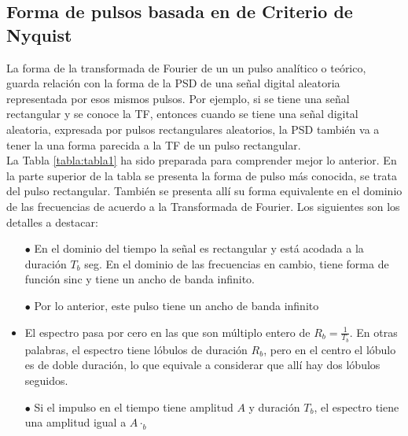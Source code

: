 \subsection{Forma de pulsos basada en de Criterio de Nyquist}

La forma de la transformada de Fourier de un un pulso analítico o teórico, guarda relación con la forma de la PSD de una señal digital aleatoria representada por esos mismos pulsos. Por ejemplo, si se tiene una señal rectangular y se conoce la TF, entonces cuando se tiene una señal digital aleatoria, expresada por pulsos rectangulares aleatorios, la PSD también va a tener la una forma parecida a la TF de un pulso rectangular.\\
La Tabla \ref{tabla:tabla1} ha sido preparada para comprender mejor lo anterior. En la parte superior de la tabla se presenta la forma de pulso más conocida, se trata del pulso rectangular. También se presenta allí su forma equivalente en el dominio de las frecuencias de acuerdo a la Transformada de Fourier. Los siguientes son los detalles a destacar:

\begin{itemize}
    \item [$\bullet$] En el dominio del tiempo la señal es rectangular y está acodada a la duración $T_b$ seg. En el dominio de las frecuencias en cambio, tiene forma de función sinc y tiene un ancho de banda infinito.
    \item [$\bullet$] Por lo anterior, este pulso tiene un ancho de banda infinito
    \item El espectro pasa por cero en las que son múltiplo entero de $R_b=\frac{1}{T_b}$. En otras palabras, el espectro tiene lóbulos de duración $R_b$, pero en el centro el lóbulo es de doble duración, lo que equivale a considerar que allí hay dos lóbulos seguidos.
    \item [$\bullet$]  Si el impulso en el tiempo tiene amplitud $A$ y duración $T_b$, el espectro tiene una amplitud igual a $A \cdot_b$
\end{itemize}

